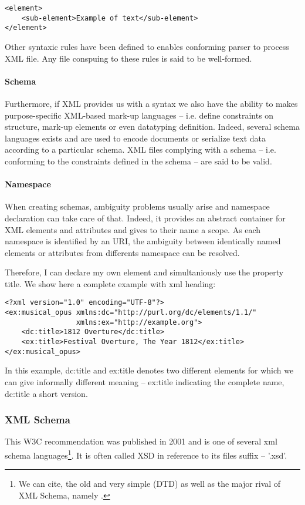 \begin{Verbatim}[fontsize=\small,formatcom=\color{black!70}]
<element>
	<sub-element>Example of text</sub-element>
</element>
\end{Verbatim}

Other syntaxic rules have been defined to enables conforming parser to process XML file. Any file conspuing to these rules is said to be well-formed.

\paragraph{Schema}
Furthermore, if XML provides us with a syntax we also have the ability to makes purpose-specific XML-based mark-up languages – i.e. define constraints on structure, mark-up elements or even datatyping definition. Indeed, several schema languages exists and are used to encode documents or serialize text data according to a particular schema. XML files complying with a schema – i.e. conforming to the constraints defined in the schema – are said to be valid.

\paragraph{Namespace}
When creating schemas, ambiguity problems usually arise and namespace declaration can take care of that. Indeed, it provides an abstract container for XML elements and attributes and gives to their name a scope. As each namespace is identified by an URI, the ambiguity between identically named elements or attributes from differents namespace can be resolved. 

Therefore, I can declare my own  element and simultaniously use the  property title. We show here a complete example with xml heading:
\begin{Verbatim}[fontsize=\small,formatcom=\color{black!70}]
<?xml version="1.0" encoding="UTF-8"?>
<ex:musical_opus xmlns:dc="http://purl.org/dc/elements/1.1/"
    			 xmlns:ex="http://example.org">
	<dc:title>1812 Overture</dc:title>
    <ex:title>Festival Overture, The Year 1812</ex:title>
</ex:musical_opus>
\end{Verbatim}

In this example, dc:title and ex:title denotes two different elements for which we can give informally different meaning – ex:title indicating the complete name, dc:title a short version. 

\subsubsection*{XML Schema}
This W3C recommendation was published in 2001 and is one of several xml schema languages\footnote{We can cite, the old and very simple (DTD) as well as the major rival of XML Schema, namely .}. It is often called XSD in reference to its files suffix – '.xsd'.

